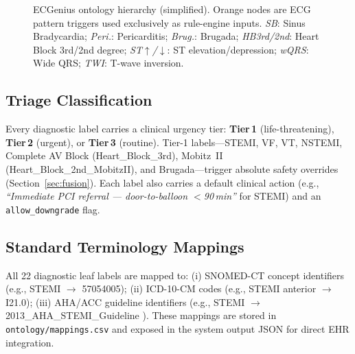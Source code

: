 \documentclass[journal]{IEEEtran}
\begin{document}
\begin{figure}[!t]
\caption{ECGenius ontology hierarchy (simplified). Orange nodes are
ECG pattern triggers used exclusively as rule-engine inputs.
\textit{SB}: Sinus Bradycardia; \textit{Peri.}: Pericarditis;
\textit{Brug.}: Brugada; \textit{HB3rd/2nd}: Heart Block 3rd/2nd degree;
\textit{ST$\uparrow$/$\downarrow$}: ST elevation/depression;
\textit{wQRS}: Wide QRS; \textit{TWI}: T-wave inversion.}
\label{fig:ontology}
\end{figure}

\subsection{Triage Classification}

Every diagnostic label carries a clinical urgency tier:
\textbf{Tier\,1} (life-threatening), \textbf{Tier\,2} (urgent),
or \textbf{Tier\,3} (routine).
Tier-1 labels---STEMI, VF, VT, NSTEMI, Complete AV Block
(Heart\_Block\_3rd), Mobitz~II (Heart\_Block\_2nd\_MobitzII),
and Brugada---trigger absolute safety overrides (Section~\ref{sec:fusion}).
Each label also carries a default clinical action (e.g.,
\textit{``Immediate PCI referral — door-to-balloon $<$90\,min''} for
STEMI) and an \texttt{allow\_downgrade} flag.

\subsection{Standard Terminology Mappings}

All 22 diagnostic leaf labels are mapped to:
(i) SNOMED-CT concept identifiers \cite{snomedct}
    (e.g., STEMI $\to$ 57054005);
(ii) ICD-10-CM codes \cite{icd10}
    (e.g., STEMI anterior $\to$ I21.0);
(iii) AHA/ACC guideline identifiers
    (e.g., STEMI $\to$ 2013\_AHA\_STEMI\_Guideline \cite{ogara2013stemi}).
These mappings are stored in \texttt{ontology/mappings.csv} and
exposed in the system output JSON for direct EHR integration.
\end{document}
